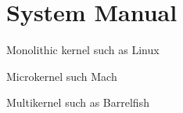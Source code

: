 \section{System Manual}

Monolithic kernel such as Linux \cite{Linux}

Microkernel \cite{Black1992:Microkernel} such Mach \cite{}

Multikernel \cite{Baumann2009:Multikernel} such as Barrelfish

